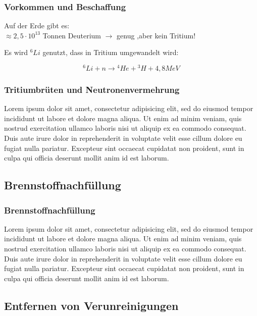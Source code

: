\documentclass[aspectratio=169]{beamer}
\begin{document}
      \begin{frame}
        \frametitle{Vorkommen und Beschaffung}

        Auf der Erde gibt es:\\

        \( \approx 2,5 \cdot 10^{13}\) Tonnen Deuterium \( \rightarrow \) genug
        ,aber kein Tritium!

        Es wird \( {}^6Li\) genutzt, dass in Tritium umgewandelt wird:

        \begin{equation}
          {}^6Li + n \rightarrow {}^4He + {}^3H+ 4,8MeV
        \end{equation}

      \end{frame}

      \begin{frame}
        \frametitle{Tritiumbrüten und Neutronenvermehrung}
        Lorem ipsum dolor sit amet, consectetur adipisicing elit, sed do eiusmod tempor incididunt ut labore et dolore magna aliqua. Ut enim ad minim veniam, quis nostrud exercitation ullamco laboris nisi ut aliquip ex ea commodo consequat. Duis aute irure dolor in reprehenderit in voluptate velit esse cillum dolore eu fugiat nulla pariatur. Excepteur sint occaecat cupidatat non proident, sunt in culpa qui officia deserunt mollit anim id est laborum.
      \end{frame}

    \subsection{Brennstoffnachfüllung}

      \begin{frame}
        \frametitle{Brennstoffnachfüllung}
        Lorem ipsum dolor sit amet, consectetur adipisicing elit, sed do eiusmod tempor incididunt ut labore et dolore magna aliqua. Ut enim ad minim veniam, quis nostrud exercitation ullamco laboris nisi ut aliquip ex ea commodo consequat. Duis aute irure dolor in reprehenderit in voluptate velit esse cillum dolore eu fugiat nulla pariatur. Excepteur sint occaecat cupidatat non proident, sunt in culpa qui officia deserunt mollit anim id est laborum.
      \end{frame}

    \subsection{Entfernen von Verunreinigungen}
\end{document}
